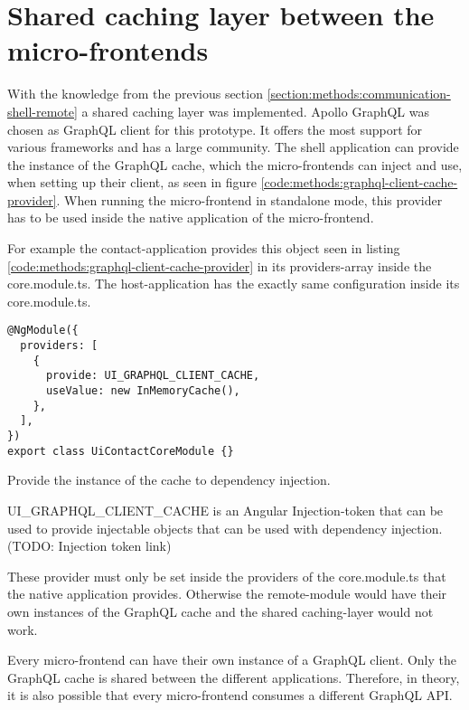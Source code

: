 \section{Shared caching layer between the micro-frontends}\label{section:applied-methods:shared-caching-layer}

With the knowledge from the previous section \ref{section:methods:communication-shell-remote} a shared caching layer was implemented. Apollo GraphQL was chosen as GraphQL client for this prototype. It offers the most support for various frameworks and has a large community. The shell application can provide the instance of the GraphQL cache, which the micro-frontends can inject and use, when setting up their client, as seen in figure \ref{code:methods:graphql-client-cache-provider}. When running the micro-frontend in standalone mode, this provider has to be used inside the native application of the micro-frontend.

For example the contact-application provides this object seen in listing \ref{code:methods:graphql-client-cache-provider} in its providers-array inside the core.module.ts. The host-application has the exactly same configuration inside its core.module.ts.

\ifshowListings
\begin{listing}[H]
\begin{verbatim}
@NgModule({
  providers: [
    {
      provide: UI_GRAPHQL_CLIENT_CACHE,
      useValue: new InMemoryCache(),
    },
  ],
})
export class UiContactCoreModule {}
\end{verbatim}
\caption{Provide the instance of the cache to dependency injection.}\label{code:methods:graphql-client-cache-provider}
\end{listing}
\fi

UI\_GRAPHQL\_CLIENT\_CACHE is an Angular Injection-token that can be used to provide injectable objects that can be used with dependency injection. (TODO: Injection token link)

These provider must only be set inside the providers of the core.module.ts that the native application provides. Otherwise the remote-module would have their own instances of the GraphQL cache and the shared caching-layer would not work.

Every micro-frontend can have their own instance of a GraphQL client. Only the GraphQL cache is shared between the different applications. Therefore, in theory, it is also possible that every micro-frontend consumes a different GraphQL API.

